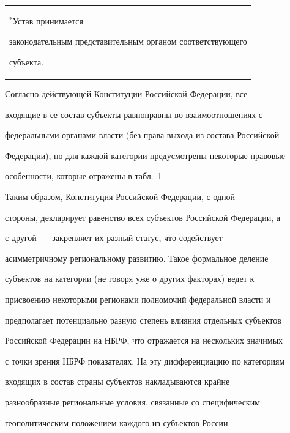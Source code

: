 \begin{table}
\begin{center}
\begin{tabular}{|l|p{84mm}|}
\hline


\multicolumn{2}{p{126mm}}{\footnotesize $^*$Устав принимается


законодательным представительным органом соответствующего


субъекта.}


\end{tabular}


\end{center}


\vspace*{-12pt}


\end{table}





    Согласно действующей Конституции Российской Федерации, все


входящие в ее состав субъекты равноправны во взаимоотношениях с


федеральными органами власти (без права выхода из состава Российской


Федерации), но для каждой категории предусмотрены некоторые правовые


особенности, которые отражены в табл.~1.





    Таким образом, Конституция Российской Федерации, с одной


стороны, декларирует равенство всех субъектов Российской Федерации, а


с другой~--- закрепляет их разный статус, что содействует


асимметричному региональному развитию. Такое формальное деление


субъектов на категории (не говоря уже о других факторах) ведет к


присвоению некоторыми регионами полномочий федеральной власти и


предполагает потенциально разную степень влияния отдельных субъектов


Российской Федерации на НБРФ, что отражается на нескольких значимых


с точки зрения НБРФ показателях. На эту дифференциацию по категориям


входящих в состав страны субъектов накладываются крайне


разнообразные региональные условия, связанные со специфическим


геополитическим положением каждого из субъектов России.











